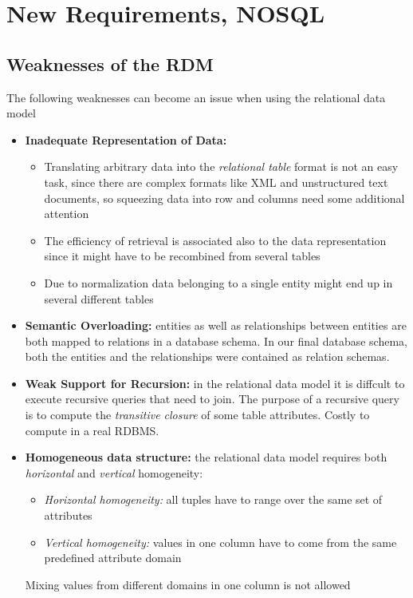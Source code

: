 \chapter{New Requirements, NOSQL}
\section{Weaknesses of the RDM}
The following weaknesses can become an issue when using the relational data model
\begin{itemize}
    \item \textbf{Inadequate Representation of Data:} 
    \begin{itemize}
        \item Translating arbitrary data into the \textit{relational table} format is not an easy task, since there are complex formats like XML and unstructured text documents, so squeezing data into row and columns need some additional attention
        \item The efficiency of retrieval is associated also to the data representation since it might have to be recombined from several tables
        \item Due to normalization data belonging to a single entity might end up in several different tables
    \end{itemize}
    \item \textbf{Semantic Overloading:} entities as well as relationships between entities are both mapped to relations in a database schema. In our final database schema, both the entities and the relationships were contained as relation schemas.
    \item \textbf{Weak Support for Recursion:} in the relational data model it is diffcult to execute recursive queries that need to join. The purpose of a recursive query is to compute the \textit{transitive closure} of some table attributes. Costly to compute in a real RDBMS.
    \item \textbf{Homogeneous data structure:} the relational data model requires both \textit{horizontal} and \textit{vertical} homogeneity:
    \begin{itemize}
        \item \textit{Horizontal homogeneity:} all tuples have to range over the same set of attributes
        \item \textit{Vertical homogeneity:} values in one column have to come from the same predefined attribute domain
    \end{itemize}
    Mixing values from different domains in one column is not allowed
\end{itemize}

